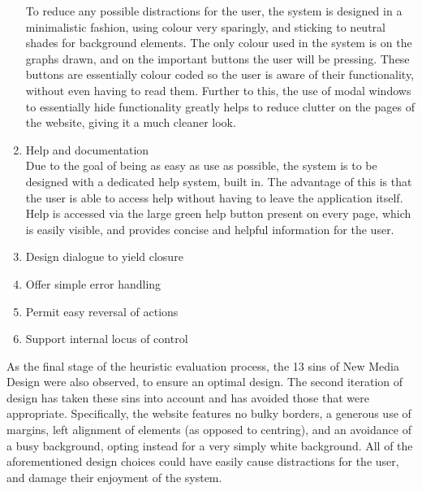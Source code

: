 \begin{enumerate}
To reduce any possible distractions for the user, the system is designed in a minimalistic fashion, using colour very sparingly, and sticking to neutral shades for background elements. The only colour used in the system is on the graphs drawn, and on the important buttons the user will be pressing. These buttons are essentially colour coded so the user is aware of their functionality, without even having to read them. Further to this, the use of modal windows to essentially hide functionality greatly helps to reduce clutter on the pages of the website, giving it a much cleaner look.
\item Help and documentation\\
Due to the goal of being as easy as use as possible, the system is to be designed with a dedicated help system, built in. The advantage of this is that the user is able to access help without having to leave the application itself. Help is accessed via the large green help button present on every page, which is easily visible, and provides concise and helpful information for the user.
\item Design dialogue to yield closure\\

\item Offer simple error handling\\

\item Permit easy reversal of actions\\

\item Support internal locus of control\\


\end{enumerate}

As the final stage of the heuristic evaluation process, the 13 sins of New Media Design \cite{golombisky2013white} were also observed, to ensure an optimal design. The second iteration of design has taken these sins into account and has avoided those that were appropriate. Specifically, the website features no bulky borders, a generous use of margins, left alignment of elements (as opposed to centring), and an avoidance of a busy background, opting instead for a very simply white background. All of the aforementioned design choices could have easily cause distractions for the user, and damage their enjoyment of the system.











